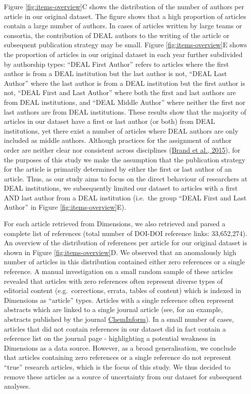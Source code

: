 \documentclass[
]{article}
\begin{document}
Figure \ref{fig:items-overview}C shows the distribution of the number of authors per article in our original dataset. The figure shows that a high proportion of articles contain a large number of authors. In cases of articles written by large teams or consortia, the contribution of DEAL authors to the writing of the article or subsequent publication strategy may be small. Figure \ref{fig:items-overview}E shows the proportion of articles in our original dataset in each year further subdivided by authorship types: ``DEAL First Author'' refers to articles where the first author is from a DEAL institution but the last author is not, ``DEAL Last Author'' where the last author is from a DEAL institution but the first author is not, ``DEAL First and Last Author'' where both the first and last authors are from DEAL institutions, and ``DEAL Middle Author'' where neither the first nor last authors are from DEAL institutions. These results show that the majority of articles in our dataset have a first or last author (or both) from DEAL institutions, yet there exist a number of articles where DEAL authors are only included as middle authors. Although practices for the assignment of author order are neither clear nor consistent across disciplines (\href{https://doi.org/10.1087/20150211}{Brand et al., 2015}), for the purposes of this study we make the assumption that the publication strategy for the article is primarily determined by either the first or last author of an article. Thus, as our study aims to focus on the direct behaviour of researchers at DEAL institutions, we subsequently limited our dataset to articles with a first AND last author from a DEAL institution (i.e.~the group ``DEAL First and Last Author'' in Figure \ref{fig:items-overview}E).

For each article retrieved from Dimensions, we also retrieved and parsed a complete list of references (total number of DOI-DOI reference links: 33,652,274). An overview of the distribution of references per article for our original dataset is shown in Figure \ref{fig:items-overview}D. We observed that an anomalously high number of articles in this distribution contained either zero references or a single reference. A manual investigation on a small random sample of these articles revealed that articles with zero references often represent diverse types of editorial content (e.g.~corrections, errata, tables of content) which is indexed in Dimensions as ``article'' types. Articles with a single reference often represent abstracts which are linked to a single journal article (see, for an example, abstracts published by the journal \href{https://onlinelibrary.wiley.com/journal/15222667}{ChemInform}). In a small number of cases, articles that did not contain references in our dataset did in fact contain a reference list on the journal page - highlighting a potential weakness in Dimensions as a data source. However, as a broad generalisation, we conclude that articles containing zero references or a single reference do not represent ``true'' research articles, which is the focus of this study. We thus decided to remove these articles as a source of uncertainty from our dataset for subsequent analyses.
\end{document}

